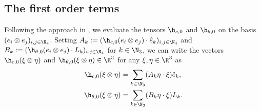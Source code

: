 


\subsection{The first order terms}
Following the approach in \cite{Alouges2017}, we evaluate the tensors $\h_{c,0}$ and $\h_{\theta,0}$ on the basis $(e_{i} \otimes e_{j})_{i,j \in \N_4}$. Setting $A_k := (\h_{c,0}(e_i \otimes e_j)\cdot \hat{e}_k)_{i,j \in \N_4}$ and $B_k:= (\h_{\theta,0}(e_i \otimes e_j)\cdot L_k)_{i,j \in \N_4}$ for $k \in \N_3$, we can write the vectors $\h_{c,0}(\xi \otimes \eta)$ and $\h_{\theta,0}(\xi \otimes \eta) \in \R^3$ for any $\xi, \eta \in \R^3$ as
\begin{align}
\label{eq: matrix representation of spatial first order term}
	\h_{c,0}(\xi \otimes \eta) &= \sum_{k \in \N_3}(A_k \eta \cdot \xi)\hat{e}_k, \\
\label{eq: matrix representation of angular first order term}
	\h_{\theta, 0}(\xi \otimes \eta) &= \sum_{k \in \N_3}(B_k \eta \cdot \xi) L_k.
\end{align}

